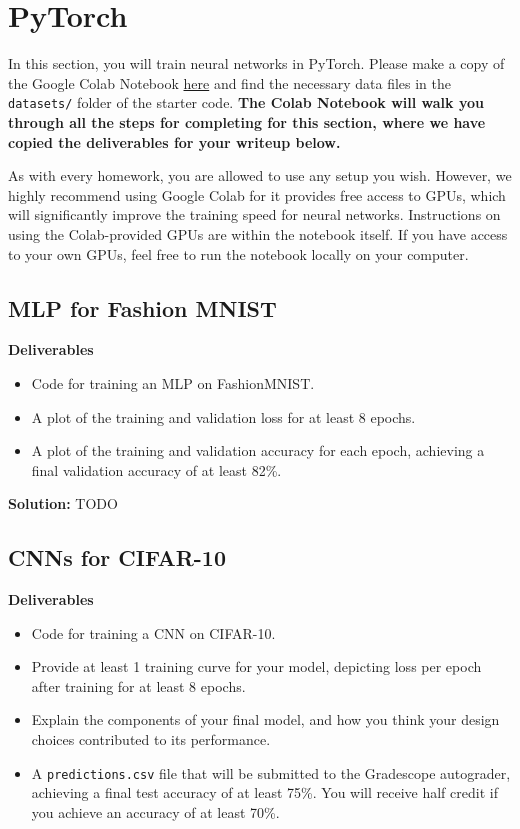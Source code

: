 \documentclass{article}
\newcommand{\Question}[1]{\Large \section{ #1 } \normalsize}
\newenvironment{solution}{\color{blue} \smallskip \textbf{Solution:}}{}
\begin{document}
\newpage
\Question{PyTorch}
In this section, you will train neural networks in PyTorch. 
Please make a copy of the Google Colab Notebook \href{https://colab.research.google.com/drive/1CYrntMond0Q8hw2UWS_N2sBwwDW2xhbn?usp=sharing}{here} and find the necessary data files in the \texttt{datasets/} folder of the starter code. 
\textbf{The Colab Notebook will walk you through all the steps for completing for this section, where we have copied the deliverables for your writeup below.}

As with every homework, you are allowed to use any setup you wish. 
However, we highly recommend using Google Colab for it provides free access to GPUs, which will significantly improve the training speed for neural networks. 
Instructions on using the Colab-provided GPUs are within the notebook itself. 
If you have access to your own GPUs, feel free to run the notebook locally on your computer.

\subsection{MLP for Fashion MNIST}
\textbf{Deliverables}
\begin{itemize}
    \item 
    Code for training an MLP on FashionMNIST.
    \item 
    A plot of the training and validation loss for at least 8 epochs.
    \item 
    A plot of the training and validation accuracy for each epoch, achieving a final validation accuracy of at least 82\%.
\end{itemize}

\begin{solution}
    TODO
\end{solution}

\newpage
\subsection{CNNs for CIFAR-10}
\textbf{Deliverables}
\begin{itemize}
    \item 
    Code for training a CNN on CIFAR-10.
    \item 
    Provide at least 1 training curve for your model, depicting loss per epoch after training for at least 8 epochs.
    \item 
    Explain the components of your final model, and how you think your design choices contributed to its performance.
    \item 
    A \texttt{predictions.csv} file that will be submitted to the Gradescope autograder, achieving a final test accuracy of at least 75\%. 
    You will receive half credit if you achieve an accuracy of at least 70\%.
\end{itemize}
\end{document}
